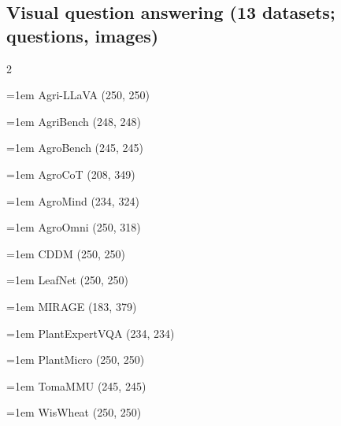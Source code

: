 \subsection*{Visual question answering (13 datasets; questions, images)}
\begin{multicols}{2}\raggedright
\hangindent=1em Agri-LLaVA (250, 250)\par
\hangindent=1em AgriBench (248, 248)\par
\hangindent=1em AgroBench (245, 245)\par
\hangindent=1em AgroCoT (208, 349)\par
\hangindent=1em AgroMind (234, 324)\par
\hangindent=1em AgroOmni (250, 318)\par
\hangindent=1em CDDM (250, 250)\par
\hangindent=1em LeafNet (250, 250)\par
\hangindent=1em MIRAGE (183, 379)\par
\hangindent=1em PlantExpertVQA (234, 234)\par
\hangindent=1em PlantMicro (250, 250)\par
\hangindent=1em TomaMMU (245, 245)\par
\hangindent=1em WisWheat (250, 250)\par
\end{multicols}
